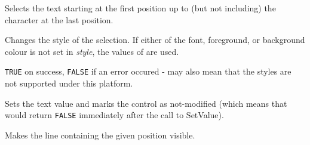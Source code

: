 \label{wxtextctrlsetselection}


Selects the text starting at the first position up to (but not including) the character at the last position.




\label{wxtextctrlsetstyle}


Changes the style of the selection. If either of the font, foreground, or
background colour is not set in {\it style}, the values of\rtfsp
{} are used.






{\tt TRUE} on success, {\tt FALSE} if an error occured - may also mean that
the styles are not supported under this platform.

\label{wxtextctrlsetvalue}


Sets the text value and marks the control as not-modified (which means that 
 would return {\tt FALSE} immediately
after the call to SetValue).



\label{wxtextctrlshowposition}


Makes the line containing the given position visible.

